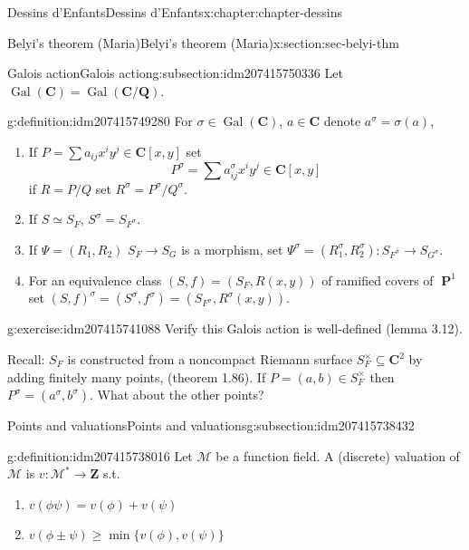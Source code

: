 \documentclass[oneside,10pt,]{book}
\numberwithin{equation}{section}
\newcommand{\lb}{[}
\newcommand{\rb}{]}
\newcommand{\ZZ}{\mathbf{Z}}
\newcommand{\QQ}{\mathbf{Q}}
\newcommand{\CC}{\mathbf{C}}
\newcommand{\Gal}[2]{\operatorname{Gal}(#1/#2)}
\DeclareMathOperator{\PP}{\mathbf{P}}
\begin{document}
\begin{chapterptx}{Dessins d'Enfants}{}{Dessins d'Enfants}{}{}{x:chapter:chapter-dessins}
\begin{sectionptx}{Belyi's theorem (Maria)}{}{Belyi's theorem (Maria)}{}{}{x:section:sec-belyi-thm}
%
\begin{subsectionptx}{Galois action}{}{Galois action}{}{}{g:subsection:idm207415750336}
Let \(\operatorname{Gal}(\CC) = \Gal{\CC}{\QQ}\).%
\begin{definition}{}{g:definition:idm207415749280}%
For \(\sigma \in \operatorname{Gal}(\CC)\), \(a\in \CC\) denote \(a^\sigma = \sigma(a)\),%
\begin{enumerate}
\item{}If \(P = \sum a_{ij} x^iy^j \in \CC\lb x,y\rb\) set%
\begin{equation*}
P^\sigma = \sum a^\sigma_{ij} x^iy^j \in \CC\lb x,y\rb
\end{equation*}
if \(R = P/Q\) set \(R^\sigma = P^\sigma / Q^\sigma\).%
\item{}If \(S \simeq S_F\), \(S^\sigma = S_{F^\sigma}\).%
\item{}If \(\Psi = (R_1, R_2)\) \(S_F\to S_G\) is a morphism, set \(\Psi^ \sigma = (R_1^\sigma , R_2 ^\sigma) \colon S_{F^\sigma} \to S_{G^\sigma}\).%
\item{}For an equivalence class \((S,f) = (S_F, R(x,y))\) of ramified covers of \(\PP^1\) set \((S,f)^\sigma = (S^\sigma, f^\sigma) = (S_{F^\sigma}, R^\sigma (x,y))\).%
\end{enumerate}
%
\end{definition}
\begin{inlineexercise}{}{g:exercise:idm207415741088}%
Verify this Galois action is well-defined (lemma 3.12).%
\end{inlineexercise}
Recall: \(S_F\) is    constructed from a noncompact Riemann surface \(S_F^\times \subseteq \CC^2\) by adding finitely many points, (theorem 1.86). If \(P=  (a,b) \in S_F^\times\) then \(P^\sigma = (a^\sigma, b^\sigma)\). What about the other points?%
\end{subsectionptx}
%
%
\typeout{************************************************}
\typeout{************************************************}
%
\begin{subsectionptx}{Points and valuations}{}{Points and valuations}{}{}{g:subsection:idm207415738432}
\begin{definition}{}{g:definition:idm207415738016}%
Let \(\mathcal M\) be a function field. A (discrete) valuation of \(\mathcal M\) is \(v \colon \mathcal M^* \to \ZZ\) s.t.%
\begin{enumerate}
\item{}\(v(\phi\psi) = v(\phi)  + v(\psi)\)%
\item{}\(v(\phi\pm\psi) \ge \min\{ v(\phi)  , v(\psi)\}\)%

\end{enumerate}
\end{definition}
\end{subsectionptx}
\end{sectionptx}
\end{chapterptx}
\end{document}
